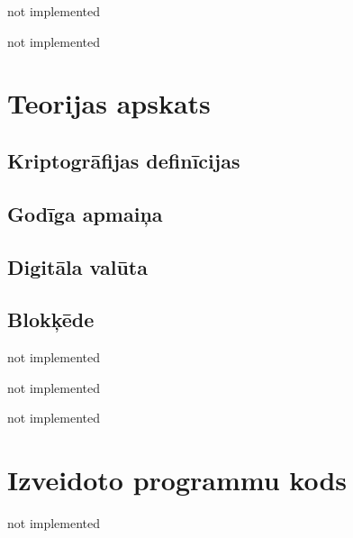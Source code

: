 \documentclass[singlespacing, latexmargins]{ludis}
\begin{document}
\maketitle

\begin{abstract-lv}
    not implemented

\end{abstract-lv}

\begin{abstract-en}
    not implemented

\end{abstract-en}

\tableofcontents





\chapter{Teorijas apskats}


\section{Kriptogrāfijas definīcijas}


\section{Godīga apmaiņa}


\section{Digitāla valūta}

\section{Blokķēde}

not implemented

not implemented

not implemented


\appendix
\chapter{Izveidoto programmu kods}
not implemented
\end{document}
